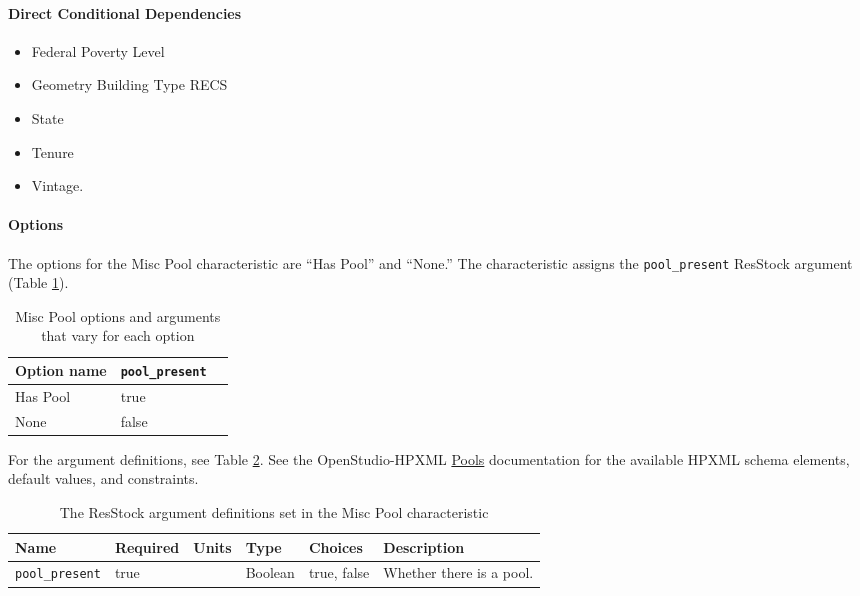 \paragraph{Direct Conditional Dependencies}
\begin{itemize}
    \item Federal Poverty Level
    \item Geometry Building Type RECS
    \item State
    \item Tenure
    \item Vintage.
\end{itemize}

\paragraph{Options}
The options for the Misc Pool characteristic are ``Has Pool'' and ``None.'' The characteristic assigns the \texttt{pool\_present} ResStock argument (Table \ref{table:opt_def_pool}).

\begin{longtable}[]{ |p{2.5cm}|p{4cm}|p{4cm}| }
\caption{Misc Pool options and arguments that vary for each option} \label{table:opt_def_pool}\\
\toprule\noalign{}
Option name & \texttt{pool\_present} \\
\midrule\noalign{}
\endhead
\bottomrule\noalign{}
\endlastfoot
Has Pool & true \\
None & false \\
\end{longtable}

For the argument definitions, see Table \ref{table:hc_arg_def_pool}. See the OpenStudio-HPXML \href{https://openstudio-hpxml.readthedocs.io/en/v1.8.1/workflow_inputs.html#hpxml-pools}{Pools} documentation for the available HPXML schema elements, default values, and constraints.

\begin{longtable}[]{ |p{}|p{1.5cm}|p{1cm}|p{1.1cm}|p{3.4cm}|p{4cm}| }
\caption{The ResStock argument definitions set in the Misc Pool characteristic} \label{table:hc_arg_def_pool} \\
\toprule\noalign{}
Name & Required & Units & Type & Choices & Description \\
\midrule\noalign{}
\endhead
\bottomrule\noalign{}
\endlastfoot
\texttt{pool\_present} & true & & Boolean & true, false & Whether there
is a pool. \\
\end{longtable}

